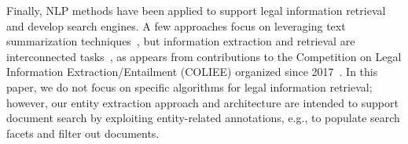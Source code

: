 %




Finally, NLP methods have been applied to support legal information retrieval and develop search engines. A few approaches focus on leveraging text summarization techniques~\cite{passage_based_text_summarization_LIR_2019,combining_bandits_lexical_analysis_2020,hu2022bert_lf}, but information extraction and retrieval are interconnected tasks~\cite{CASTANO2022101842}, as appears from contributions to the Competition on Legal Information Extraction/Entailment (COLIEE) organized since 2017~\cite{cooliedescropt}. In this paper, we do not focus on specific algorithms for legal information retrieval; however, our entity extraction approach and architecture are intended to support document search by exploiting entity-related annotations, e.g., to populate search facets and filter out documents. 

